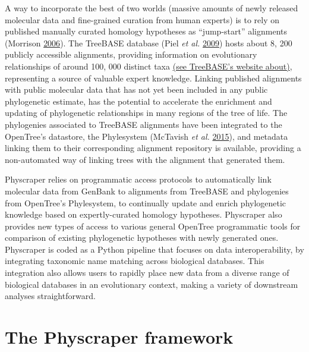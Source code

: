\documentclass[]{article}
\begin{document}
A way to incorporate the best of two worlds (massive amounts of newly released molecular data and fine-grained curation from human experts) is to rely on published manually curated homology hypotheses as ``jump-start'' alignments (Morrison \protect\hyperlink{ref-morrison2006multiple}{2006}). The TreeBASE database (Piel \emph{et al.} \protect\hyperlink{ref-piel2009treebase}{2009}) hosts about 8, 200 publicly accessible alignments, providing information on evolutionary relationships of around 100, 000 distinct taxa \href{https://www.treebase.org/treebase-web/home.html\#:~:text=TreeBASE\%20is\%20produced\%20and\%20governed,mapped\%20to\%20104\%2C593\%20distinct\%20taxa.}{(see TreeBASE's website about)}, representing a source of valuable expert knowledge. Linking published alignments with public molecular data that has not yet been included in any public phylogenetic estimate, has the potential to accelerate the enrichment and updating of phylogenetic relationships in many regions of the tree of life. The phylogenies associated to TreeBASE alignments have been integrated to the OpenTree's datastore, the Phylesystem (McTavish \emph{et al.} \protect\hyperlink{ref-mctavish2015phylesystem}{2015}), and metadata linking them to their corresponding alignment repository is available, providing a non-automated way of linking trees with the alignment that generated them.

Physcraper relies on programmatic access protocols to automatically link molecular data from GenBank to alignments from TreeBASE and phylogenies from OpenTree's Phylesystem, to continually update and enrich phylogenetic knowledge based on expertly-curated homology hypotheses. Physcraper also provides new types of access to various general OpenTree programmatic tools for comparison of existing phylogenetic hypotheses with newly generated ones.
Physcraper is coded as a Python pipeline that focuses on data interoperability, by integrating taxonomic name matching across biological databases. This integration also allows users to rapidly place new data from a diverse range of biological databases in an evolutionary context, making a variety of downstream analyses straightforward.

\hypertarget{the-physcraper-framework}{%
\section{The Physcraper framework}\label{the-physcraper-framework}}
\end{document}
